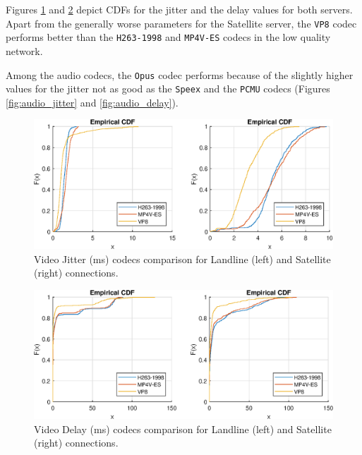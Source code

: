 \documentclass[parskip=full]{scrartcl}
\begin{document}
Figures \ref{fig:video_jitter} and \ref{fig:video_delay} depict CDFs for the jitter and the delay values for both servers. Apart from the generally worse parameters for the Satellite server, the \texttt{VP8} codec performs better than the \texttt{H263-1998} and \texttt{MP4V-ES} codecs in the low quality network. 

Among the audio codecs, the \texttt{Opus} codec performs because of the slightly higher values for the jitter not as good as the \texttt{Speex} and the \texttt{PCMU} codecs (Figures \ref{fig:audio_jitter} and \ref{fig:audio_delay}).

\begin{figure}
    \centering
    \includegraphics[width=1\textwidth]{results/Video_Codecs_Satellite_Jitter.eps} 
    \caption{Video Jitter (ms) codecs comparison for Landline (left) and Satellite (right) connections. }
    \label{fig:video_jitter}
\end{figure}

\begin{figure}
    \centering
    \includegraphics[width=1\textwidth]{results/Video_Codecs_Satellite_Delay.eps} 
    \caption{Video Delay (ms) codecs comparison for Landline (left) and Satellite (right) connections. }
    \label{fig:video_delay}
\end{figure}
\end{document}
